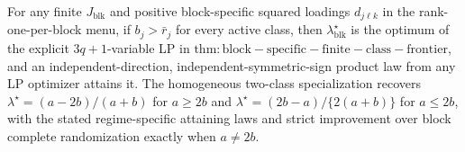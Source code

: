 For any finite \(J_{\mathrm{blk}}\) and positive block-specific squared loadings \(d_{j\ell k}\) in the rank-one-per-block menu, if \(b_j>\bar r_j\) for every active class, then \(\lambda_{\mathrm{blk}}^\star\) is the optimum of the explicit \(3q+1\)-variable LP in \(\mathrm{thm:block-specific-finite-class-frontier}\), and an independent-direction, independent-symmetric-sign product law from any LP optimizer attains it. The homogeneous two-class specialization recovers \(\lambda^\star=(a-2b)/(a+b)\) for \(a\ge2b\) and \(\lambda^\star=(2b-a)/\{2(a+b)\}\) for \(a\le2b\), with the stated regime-specific attaining laws and strict improvement over block complete randomization exactly when \(a\ne2b\).